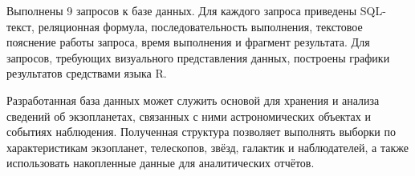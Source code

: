 \documentclass[14pt,a4paper]{extarticle}
\begin{document}
Выполнены 9 запросов к базе данных. Для каждого запроса приведены SQL-текст, реляционная формула, последовательность выполнения, текстовое пояснение работы запроса, время выполнения и фрагмент результата. Для запросов, требующих визуального представления данных, построены графики результатов средствами языка R.

Разработанная база данных может служить основой для хранения и анализа сведений об экзопланетах, связанных с ними астрономических объектах и событиях наблюдения. Полученная структура позволяет выполнять выборки по характеристикам экзопланет, телескопов, звёзд, галактик и наблюдателей, а также использовать накопленные данные для аналитических отчётов.


\newpage
\end{document}
